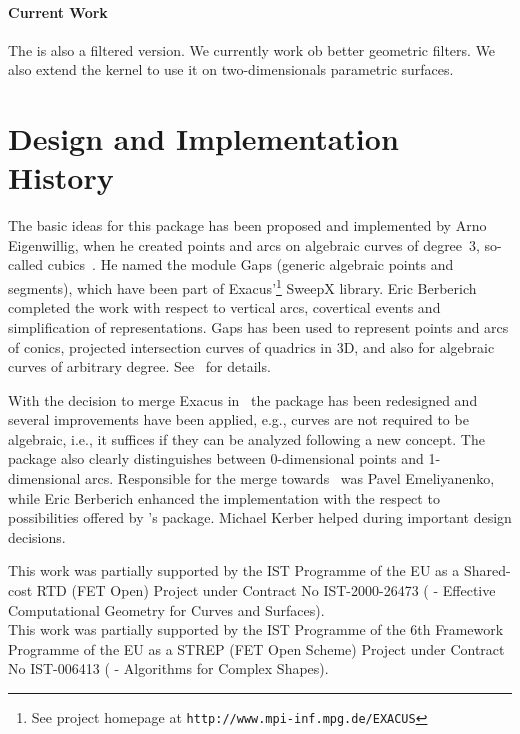 \paragraph{Current Work}

The is also a filtered version. We currently work ob better geometric filters.
We also extend the kernel to use it on two-dimensionals parametric surfaces. 

\section{Design and Implementation History}

The basic ideas for this package has been proposed and implemented
by Arno Eigenwillig, when he created points and arcs on algebraic curves
of degree~3, so-called cubics~\cite{eksw-eecaccc-06}. 
He named the module {\sc Gaps} (generic algebraic points and segments), 
which have been part of {\sc Exacus}'\footnote{See project homepage at 
{\tt http://www.mpi-inf.mpg.de/EXACUS}}
{\sc SweepX} library. Eric Berberich completed the work with respect
to vertical arcs, covertical events and simplification of representations.
{\sc Gaps} has been used to represent points and arcs of conics, projected
intersection curves of quadrics in 3D, and also for algebraic curves
of arbitrary degree. See~\cite{beh+-eeeafcs-05} for details.

With the decision to merge {\sc Exacus} in \cgal\, the package has been 
redesigned and several improvements have been applied, e.g., curves are not
required to be algebraic, i.e., it suffices if they can be analyzed following
a new concept. The package also clearly distinguishes between 0-dimensional
points and 1-dimensional arcs. Responsible for the merge towards \cgal\ was
Pavel Emeliyanenko, while Eric Berberich enhanced the implementation with the
respect to possibilities offered by 
\cgal's  package. Michael Kerber helped during
important design decisions.

This work was partially supported by the IST Programme of the EU as a
Shared-cost RTD (FET Open) Project under Contract No IST-2000-26473
( - Effective
Computational Geometry for Curves and Surfaces).\\
This work was partially supported by the IST Programme of the 6th
Framework Programme of the EU as a STREP (FET Open Scheme) Project
under Contract No IST-006413 ( -
Algorithms for Complex Shapes).

